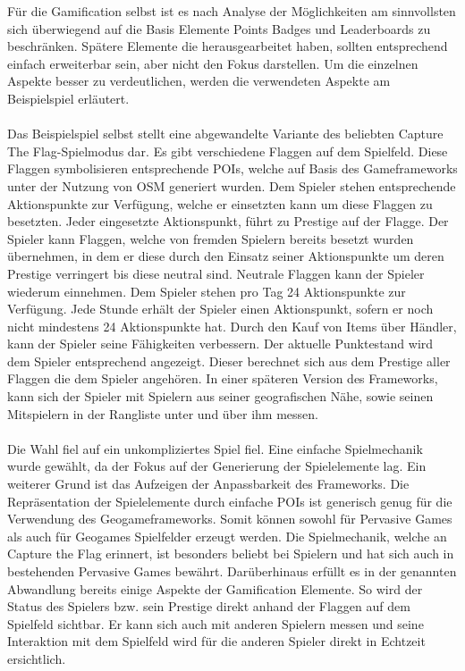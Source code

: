 Für die Gamification selbst ist es nach Analyse der Möglichkeiten am sinnvollsten sich überwiegend auf die Basis Elemente Points Badges und Leaderboards zu beschränken. Spätere Elemente die \textcite{Zichermann.2011} herausgearbeitet haben, sollten entsprechend einfach erweiterbar sein, aber nicht den Fokus darstellen. Um die einzelnen Aspekte besser zu verdeutlichen, werden die verwendeten Aspekte am Beispielspiel erläutert.
\\\\
Das Beispielspiel selbst stellt eine abgewandelte Variante des beliebten Capture The Flag-Spielmodus dar.\cite{Atkin.1999}
Es gibt verschiedene Flaggen auf dem Spielfeld. Diese Flaggen symbolisieren entsprechende POIs, welche auf Basis des Gameframeworks unter der Nutzung von OSM generiert wurden. Dem Spieler stehen entsprechende Aktionspunkte zur Verfügung, welche er einsetzten kann um diese Flaggen zu besetzten. Jeder eingesetzte Aktionspunkt, führt zu \glqq Prestige\grqq{} auf der Flagge. Der Spieler kann Flaggen, welche von fremden Spielern bereits besetzt wurden übernehmen, in dem er diese durch den Einsatz seiner Aktionspunkte um deren Prestige verringert bis diese neutral sind. Neutrale Flaggen kann der Spieler wiederum einnehmen. Dem Spieler stehen pro Tag 24 Aktionspunkte zur Verfügung. Jede Stunde erhält der Spieler einen Aktionspunkt, sofern er noch nicht mindestens 24 Aktionspunkte hat. Durch den Kauf von Items über Händler, kann der Spieler seine Fähigkeiten verbessern. Der aktuelle Punktestand wird dem Spieler entsprechend angezeigt.
Dieser berechnet sich aus dem Prestige aller Flaggen die dem Spieler angehören. 
In einer späteren Version des Frameworks,  kann sich der Spieler mit Spielern aus seiner geografischen Nähe, sowie seinen Mitspielern in der Rangliste unter und über ihm messen.
\\\\
Die Wahl fiel auf ein unkompliziertes Spiel fiel. Eine einfache Spielmechanik wurde gewählt, da der Fokus auf der Generierung der Spielelemente lag. Ein weiterer Grund ist das Aufzeigen der Anpassbarkeit des Frameworks. Die Repräsentation der Spielelemente durch einfache POIs ist generisch genug für die Verwendung des Geogameframeworks. Somit können sowohl für Pervasive Games als auch für Geogames Spielfelder erzeugt werden. Die Spielmechanik, welche an Capture the Flag erinnert, ist besonders beliebt bei Spielern und hat sich auch in bestehenden Pervasive Games bewährt.\cite{Bell.2006,Ingress.2014} Darüberhinaus erfüllt es in der genannten Abwandlung bereits einige Aspekte der Gamification Elemente. So wird der Status des Spielers bzw. sein \glqq Prestige\grqq{} direkt anhand der Flaggen auf dem Spielfeld sichtbar. Er kann sich auch mit anderen Spielern messen und seine Interaktion mit dem Spielfeld wird für die anderen Spieler direkt in Echtzeit ersichtlich.
